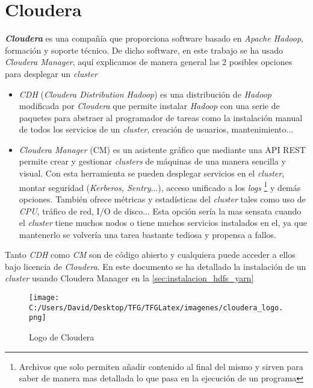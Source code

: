 \chapter{Cloudera}\label{apendix:cloudera}
\textbf{\textit{Cloudera}} es una compañía que proporciona software basado en 
\textit{Apache Hadoop}, formación y soporte técnico. 
De dicho software, en este trabajo se ha usado \textit{Cloudera Manager}, aquí explicamos de manera general 
las 2 posibles opciones para desplegar un \textit{cluster}
\begin{itemize}
  \item \textit{CDH} (\textit{Cloudera Distribution Hadoop}) es una distribución de 
  \textit{Hadoop} modificada por \textit{Cloudera} que permite instalar \textit{Hadoop} con una serie 
  de paquetes para abstraer al programador de tareas como la instalación manual de todos los servicios 
  de un \textit{cluster}, creación de usuarios, mantenimiento...
  
  \item \textit{Cloudera Manager} (CM) es un asistente gráfico que mediante 
  una API REST permite crear  y gestionar \textit{clusters} de máquinas de una manera sencilla 
  y visual. Con esta herramienta se pueden desplegar servicios en el \textit{cluster}, montar seguridad 
  (\textit{Kerberos, Sentry}...), acceso unificado a los \textit{logs}
  \footnote{Archivos que solo permiten añadir contenido al final del mismo y sirven para saber de manera 
  mas detallada lo que pasa en la ejecución de un programa} y demás opciones.
  También ofrece métricas y estadísticas del \textit{cluster} tales como uso de 
  \textit{CPU}, tráfico de red, I/O de disco...
  Esta opción sería la mas sensata cuando el \textit{cluster} tiene muchos nodos o tiene muchos servicios
  instalados en el, ya que mantenerlo se volvería una tarea bastante tediosa y propensa a fallos.
\end{itemize}

Tanto \textit{CDH} como \textit{CM} son de código abierto y cualquiera puede acceder a ellos 
bajo licencia de \textit{Cloudera}.
En este documento se ha detallado la instalación de un \textit{cluster} usando Cloudera Manager en la
\autoref{sec:instalacion_hdfs_yarn}

\begin{figure}[!htpb]
  \centering
  \texttt{[image: C:/Users/David/Desktop/TFG/TFGLatex/imagenes/cloudera\_logo.png]}
  \caption[Logo de Cloudera]{Logo de Cloudera}
  \label{cloudera_manager}
\end{figure}
